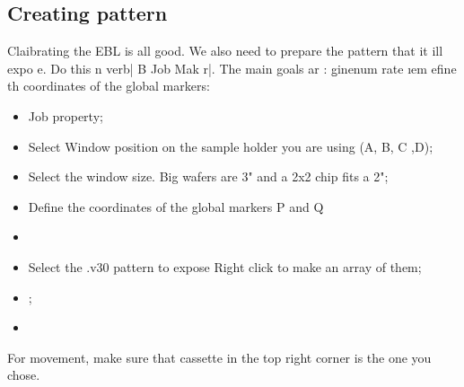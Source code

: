  \subsection{Creating pattern\label{subsec:jobMaker}}
 Claibrating the EBL is  all good.  We also need to prepare  the pattern that it
 ill expo e.   Do this n verb|  B Job Mak r|.   The main goals ar  : \b gin{enum
   rate} \i em efine th coordinates of the global markers:
 \begin{itemize}
 \item {Job property};
 \item Select Window position on the sample holder you are using (A, B, C ,D);
 \item Select the window size.  Big wafers are 3" and a 2x2 chip fits a 2";
 \item  Define the  coordinates of  the global  markers P  and Q  
 \item {}
 \end{itemize}

 \begin{itemize}
 \item Select the  .v30 pattern to expose  \ira Right click to make  an array of
   them;
 \item {} \ira  {};
 \item {}
 \end{itemize}


 \begin{framed}\noindent
   For movement, make  sure that {cassette} in  the top right corner  is the one
   you chose.
 \end{framed}
 \newpage

